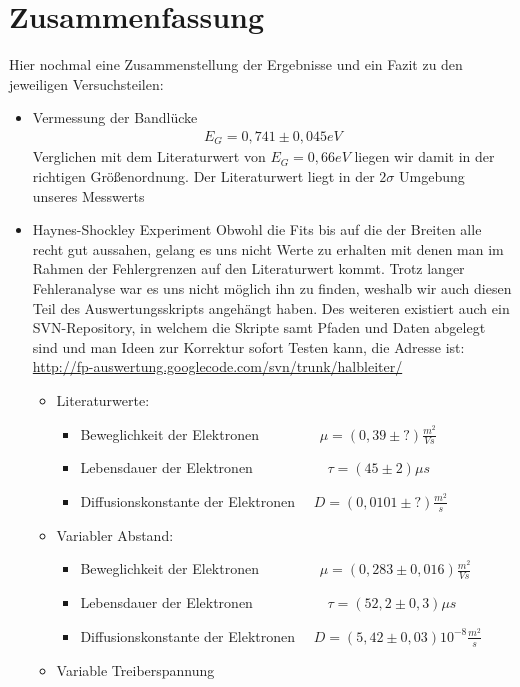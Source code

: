 \documentclass[12pt]{article}
\begin{document}
\section{Zusammenfassung}
Hier nochmal eine Zusammenstellung der Ergebnisse und ein Fazit zu den jeweiligen Versuchsteilen:
\begin{itemize}
 \item Vermessung der Bandlücke
\begin{align*}
 E_G = 0,741 \pm 0,045 eV
\end{align*}
Verglichen mit dem Literaturwert von $E_G = 0,66 eV$ liegen wir damit in der richtigen Größenordnung. Der Literaturwert liegt in der $2\sigma$ Umgebung unseres Messwerts
\item Haynes-Shockley Experiment
Obwohl die Fits bis auf die der Breiten alle recht gut aussahen, gelang es uns nicht Werte zu erhalten mit denen man im Rahmen der Fehlergrenzen auf den Literaturwert kommt. Trotz langer Fehleranalyse war es uns nicht möglich ihn zu finden, weshalb wir auch diesen Teil des Auswertungsskripts angehängt haben. Des weiteren existiert auch ein SVN-Repository, in welchem die Skripte samt Pfaden und Daten abgelegt sind und man Ideen zur Korrektur sofort Testen kann, die Adresse ist: \\ \url{http://fp-auswertung.googlecode.com/svn/trunk/halbleiter/}
\begin{itemize}
\item Literaturwerte:
\begin{itemize}
 \item Beweglichkeit der Elektronen ~~~~~~~~$\mu = (0,39 \pm ?) \frac{m^2}{Vs}$ 
 \item Lebensdauer der Elektronen ~~~~~~~~~~$\tau = (45 \pm 2) \mu s $
 \item Diffusionskonstante der Elektronen ~~$D = (0,0101 \pm ?) \frac{m^2}{s}$
\end{itemize}
\item Variabler Abstand:
\begin{itemize}
 \item Beweglichkeit der Elektronen ~~~~~~~~$\mu = (0,283 \pm 0,016) \frac{m^2}{Vs}$ 
 \item Lebensdauer der Elektronen ~~~~~~~~~~$\tau = (52,2 \pm 0,3) \mu s $
 \item Diffusionskonstante der Elektronen ~~$D = (5,42 \pm 0,03) 10^{-8} \frac{m^2}{s}$
\end{itemize}
\item Variable Treiberspannung
\begin{itemize}

\end{itemize}
\end{itemize}
\end{itemize}
\end{document}
